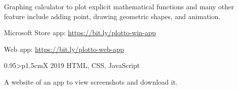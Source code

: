 \documentclass[a4paper, oneside, final]{scrartcl} %
\begin{document}
\begin{center}
\begin{paracol}{2}
\vspace{2mm}
\parbox{0.95\linewidth}{%
Graphing calculator to plot explicit mathematical functions and many other feature include adding point, drawing geometric shapes, and animation.
}%
\begin{items}
\item Microsoft Store app: \url{https://bit.ly/plotto-win-app}
\item Web app: \url{https://bit.ly/plotto-web-app}
\end{items}

\vspace{20pt}

\begin{tabularx}{0.95\linewidth}{>{\raggedleft\scshape}p{1.5cm}X}
 {}
 {2019}
 {HTML, CSS, JavaScript}
\end{tabularx}

\vspace{2mm}
\parbox{0.95\linewidth}{
A website of an app to view screenshots and download it.
}


\end{paracol}


\end{center}
\end{document}
